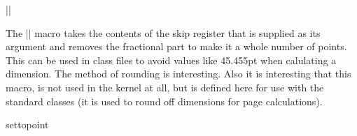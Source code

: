 |{\@settopoint}|

The |\@settopoint| macro takes the contents of the skip register that is supplied as its argument
and removes the fractional part to make it a whole number of points. This can be
used in class files to avoid values like 45.455pt when calulating a dimension. The method of
rounding is interesting. Also it is interesting that this macro, is not used in the kernel at all, but is defined
here for use with the standard classes (it is used to round off dimensions for page calculations).

\medskip
\begin{texexample}{settopoint}{}
  \makeatletter
  \def\@settopoint#1{\divide#1\p@\multiply#1\p@}
  \newlength\@test
  \setlength\@test{19.5pt}
  \@settopoint{\@test}
  \the\@test
  \makeatother
\end{texexample}




